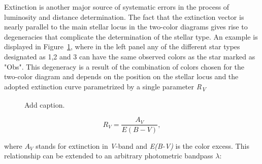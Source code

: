 \begin{figure*}[ht!]
	\caption{The left panel shows the absolute magnitude vs. color parametrization for main sequence and red giant stars. The symbols are color-coded by metallicity, ranging from $[Fe/H] = -2.5$ to 0.0 (blue to red). The three lines correspond to three values of metallicity: $[Fe/H] = -2.0, -1.0, 0.0$ (dot-dashed, solid and dashed, respectively). The middle panel shows a sample of 63,000 stars that have signal-to-noise ratio for Gaia’s parallax measurements of at least 20 (white dwarfs can be seen in the lower left corner). The dot-dashed, solid and dashed black lines are the same as in the left panel. For comparison, the dotted lines were computed using eqs. A2 and A7 from Ivezic et al. (2008). The right panel shows a sample of 415,000 stars with $r < 22$ and $u<22$ as red dots, and 409,000 of those that also have  $0.2 < g-i < 3.5$ as cyan dots. Their absolute magnitudes were computed using the so-called “photo-geometric” distances from Bailer-Jones et al. (2021). The dot-dashed, solid and dashed black lines are the same as in the left and middle panels. About 10,000 outliers seen at $g-i = 0.4$ and $Mr > 7$ are predominantly found at the faint end ($r>20$).}
	\label{fig:3HRdiags}
\end{figure*}

Extinction is another major source of systematic errors in the process of luminosity and distance determination. The fact that the extinction vector is nearly parallel to the main stellar locus in the two-color diagrams gives rise to degeneracies that complicate the determination of the stellar type. An example is displayed in Figure~\ref{fig:extinction}, where in the left panel any of the different star types designated as 1,2 and 3 can have the same observed colors as the star marked as "Obs". This degeneracy is a result of the combination of colors chosen for the two-color diagram and depends on the position on the stellar locus and the adopted extinction curve parametrized by a single parameter \textit{R\textsubscript{V}}

\begin{figure}[ht!]
	\caption{Add caption.} \label{fig:extinction}
\end{figure}

\begin{equation}
	R_V = \frac{A_V}{E(B-V)},
\end{equation}

where $A_V$ stands for extinction in \textit{V}-band and \textit{E(B-V)} is the color excess. This relationship can be extended to an arbitrary photometric bandpass $\lambda$:

